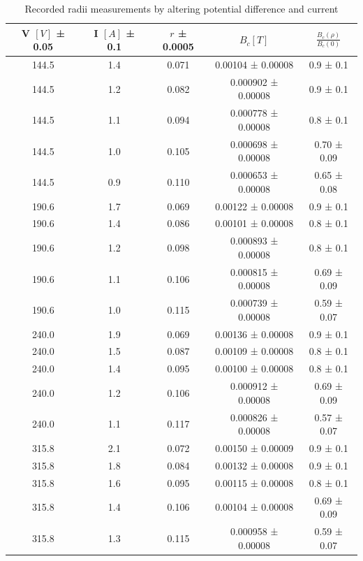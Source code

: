 \documentclass[12pt]{article}
\begin{document}
\begin{table}
    \centering
    \vspace{10pt}
        \begin{tabular}{|c|c|c|c|c|}
            \hline
            V $[V]$  ± 0.05 & I $[A]$ ± 0.1 & $r$  ± 0.0005 & $B_c [T]$ & $\frac{B_c(\rho)}{B_c(0)}$\\
            \hline
            144.5 & 1.4 & 0.071 & 0.00104 ± 0.00008 & 0.9 ± 0.1  \\
            144.5 & 1.2 & 0.082 & 0.000902 ± 0.00008 & 0.9 ± 0.1   \\
            144.5 & 1.1 & 0.094 & 0.000778 ± 0.00008 & 0.8 ± 0.1   \\
            144.5 & 1.0 & 0.105 & 0.000698 ± 0.00008 & 0.70 ± 0.09   \\
            144.5 & 0.9 & 0.110 & 0.000653 ± 0.00008 & 0.65 ± 0.08   \\
            \hline
            190.6 & 1.7 & 0.069 & 0.00122 ± 0.00008 & 0.9 ± 0.1  \\
            190.6 & 1.4 & 0.086 & 0.00101 ± 0.00008 & 0.8 ± 0.1  \\
            190.6 & 1.2 & 0.098 & 0.000893 ± 0.00008 & 0.8 ± 0.1   \\
            190.6 & 1.1 & 0.106 & 0.000815 ± 0.00008 & 0.69 ± 0.09   \\
            190.6 & 1.0 & 0.115 & 0.000739 ± 0.00008 & 0.59 ± 0.07   \\
            \hline
            240.0 & 1.9 & 0.069 & 0.00136 ± 0.00008 & 0.9 ± 0.1  \\
            240.0 & 1.5 & 0.087 & 0.00109 ± 0.00008 & 0.8 ± 0.1   \\
            240.0 & 1.4 & 0.095 & 0.00100 ± 0.00008 & 0.8 ± 0.1   \\
            240.0 & 1.2 & 0.106 & 0.000912 ± 0.00008 & 0.69 ± 0.09   \\
            240.0 & 1.1 & 0.117 & 0.000826 ± 0.00008 & 0.57 ± 0.07   \\
            \hline
            315.8 & 2.1 & 0.072 & 0.00150 ± 0.00009 & 0.9 ± 0.1  \\
            315.8 & 1.8 & 0.084 & 0.00132 ± 0.00008 & 0.9 ± 0.1   \\
            315.8 & 1.6 & 0.095 & 0.00115 ± 0.00008 & 0.8 ± 0.1   \\
            315.8 & 1.4 & 0.106 & 0.00104 ± 0.00008 & 0.69 ± 0.09   \\
            315.8 & 1.3 & 0.115 & 0.000958 ± 0.00008 & 0.59 ± 0.07   \\
            \hline
        \end{tabular}
    \caption{Recorded radii measurements by altering potential difference and current}
    \label{table}
\end{table}
\end{document}
